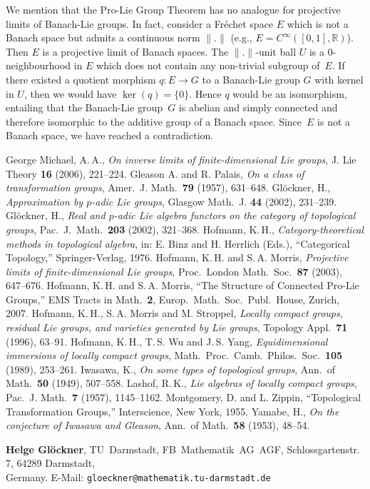 \documentclass[12pt]{article}
\newcommand{\R}{{\mathbb R}}
\begin{document}
%
%
We mention that the Pro-Lie Group Theorem
has no analogue for projective limits
of Banach-Lie groups. In fact, consider
a Fr\'{e}chet space $E$
which is not a Banach space but admits
a continuous norm $\|.\|$ (e.g., $E=C^\infty([0,1],\R)$).
Then $E$ is a projective limit
of Banach spaces. The $\|.\|$-unit ball $U$ is a $0$-neighbourhood
in $E$ which does not contain any non-trivial subgroup
of~$E$.
If there existed a quotient morphism
$q\colon E\to G$ to a Banach-Lie group $G$
with kernel in $U$, then we would have $\ker(q)=\{0\}$.
Hence $q$ would be an isomorphism,
entailing that the Banach-Lie group~$G$
is abelian and simply connected and
therefore isomorphic to the additive
group of a Banach space. Since~$E$
is not a Banach space, we have reached a contradiction.
%
%
\begin{thebibliography}{99}
 George Michael, A.\,A.,
\emph{On inverse limits of finite-dimensional
Lie groups}, J. Lie Theory {\bf 16} (2006),
221--224.
%
%
 Gleason A. and R. Palais,
\emph{On a class of transformation groups},
Amer.\ J. Math.\ {\bf 79} (1957), 631--648.
%
%
 Gl\"{o}ckner, H., \emph{Approximation
by $p$-adic Lie groups},
Glasgow Math.\ J. {\bf 44} (2002), 231--239.
%
%
 Gl\"{o}ckner, H., \emph{Real
and $p$-adic Lie algebra functors on
the category of topological groups},
Pac.\ J.\ Math.\ {\bf 203} (2002), 321--368.
%
%
Hofmann, K.\,H., \emph{Category-theoretical
methods in topological algebra},
in: E. Binz and H. Herrlich (Eds.),
``Categorical Topology,'' Springer-Verlag, 1976.
%
%
Hofmann, K.\,H. and S.\,A. Morris,
\emph{Projective limits of finite-dimensional
Lie groups}, Proc.\ London Math.\ Soc.\
{\bf 87} (2003),
647--676.
%
Hofmann, K.\,H. and S.\,A. Morris,
``The Structure of Connected Pro-Lie Groups,''
EMS Tracts in Math.\ {\bf 2},
Europ.\ Math.\ Soc.\ Publ.\ House,
Zurich, 2007.
%
Hofmann, K.\,H., S.\,A. Morris and M. Stroppel,
\emph{Locally compact groups, residual Lie groups,
and varieties generated by Lie groups},
Topology Appl.\ {\bf 71} (1996), 63--91.
%
Hofmann, K.\,H., T.\,S. Wu and J.\,S. Yang,
\emph{Equidimensional immersions of locally compact
groups}, Math.\ Proc.\ Camb.\ Philos.\ Soc.\
{\bf 105} (1989), 253--261.
%
 Iwasawa, K., \emph{On some types
of topological groups}, Ann.\ of Math.\ {\bf 50} (1949),
507--558.
%
Lashof, R.\,K., \emph{Lie algebras of locally compact groups},
Pac.\ J. Math.\ {\bf 7} (1957), 1145--1162.
%
Montgomery, D. and L. Zippin, ``Topological Transformation Groups,''
Interscience, New York, 1955.
%
Yamabe, H., \emph{On the conjecture of Iwasawa and Gleason},
Ann.\ of Math.\ {\bf 58} (1953), 48--54.
%
\end{thebibliography}
%
\noindent
{\footnotesize
{\bf Helge Gl\"{o}ckner}, TU~Darmstadt, FB~Mathematik~AG~AGF,
Schlossgartenstr.\,7, 64289 Darmstadt,\\
Germany.
E-Mail: {\tt gloeckner@mathematik.tu-darmstadt.de}}
%
%
\end{document}
